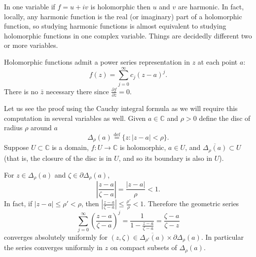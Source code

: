 \documentclass[12pt,openany]{book}
\newcommand{\sabs}[1]{\lvert {#1} \rvert}
\newcommand{\abs}[1]{\left\lvert {#1} \right\rvert}
\newcommand{\C}{{\mathbb{C}}}
\theoremstyle{plain}
\theoremstyle{remark}
\theoremstyle{definition}
\theoremstyle{exercise}
\theoremstyle{example}
\begin{document}
In one variable if $f = u+iv$ is holomorphic then $u$ and $v$
are harmonic.  In fact, locally, any harmonic function is
the real (or imaginary) part of a holomorphic function, so studying 
harmonic functions is almost equivalent to studying holomorphic
functions in one complex variable.  Things are decidedly different
two or more variables.

\medskip

Holomorphic functions admit a power series representation in $z$
at each point $a$:
\begin{equation*}
f(z) = \sum_{j=0}^\infty c_j {(z-a)}^j .
\end{equation*}
There is no $\bar{z}$ necessary there
since $\frac{\partial f}{\partial \bar{z}} = 0$.

Let us see the proof using the Cauchy integral formula as we will
require this computation in several variables as well.
Given $a \in \C$ and $\rho > 0$ define the disc of radius $\rho$ around $a$
\begin{equation*}
\Delta_\rho(a)
\overset{\text{def}}{=}
\{ z : \sabs{z-a} < \rho \} .
\end{equation*}
Suppose $U \subset \C$ is a domain, $f \colon U \to \C$ is holomorphic,
$a \in U$, and $\overline{\Delta_\rho(a)} \subset U$ (that is, the closure
of the disc is in $U$, and so its boundary is also in $U$).

For $z \in \Delta_\rho(a)$ and $\zeta \in \partial \Delta_\rho(a)$, 
\begin{equation*}
\abs{\frac{z-a}{\zeta-a}} =
\frac{\sabs{z-a}}{\rho} < 1 .
\end{equation*}
In fact, if $\sabs{z-a} \leq \rho' < \rho$, then
$\abs{\frac{z-a}{\zeta-a}} \leq \frac{\rho'}{\rho} < 1$.  Therefore
the geometric series
\begin{equation*}
\sum_{j=0}^\infty
{\left(\frac{z-a}{\zeta-a}\right)}^j
=
\frac{1}{1-
\frac{z-a}{\zeta-a}}
=
\frac{\zeta-a}{\zeta-z}
\end{equation*}
converges absolutely uniformly for $(z,\zeta) \in \overline{\Delta_{\rho'}(a)}
\times \partial \Delta_\rho(a)$.  In particular the
series converges uniformly in $z$ on compact subsets of $\Delta_{\rho}(a)$. 
\end{document}
